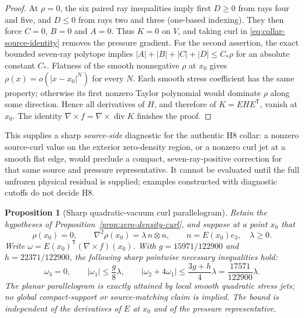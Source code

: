 \documentclass[11pt,a4paper]{article}
\theoremstyle{plain}
\newtheorem{proposition}[theorem]{Proposition}
\theoremstyle{definition}
\newcommand{\diver}{\operatorname{div}}
\begin{document}
\begin{proof}
At $\rho=0$, the six paired ray inequalities imply first
$D\ge0$ from rays four and five, and $D\le0$ from rays two and
three (one-based indexing). They then force $C=0$, $B=0$ and
$A=0$. Thus $K=0$ on $V$, and taking curl in
\eqref{eq:collar-source-identity} removes the pressure gradient.
For the second assertion, the exact bounded seven-ray polytope
implies $|A|+|B|+|C|+|D|\le C_*\rho$ for an absolute constant
$C_*$. Flatness of the smooth nonnegative $\rho$ at $x_0$ gives
$\rho(x)=o(|x-x_0|^N)$ for every $N$. Each smooth stress
coefficient has the same property; otherwise its first nonzero
Taylor polynomial would dominate $\rho$ along some direction.
Hence all derivatives of $H$, and therefore of $K=EHE^{\mathsf T}$,
vanish at $x_0$. The identity
$\nabla\times f=\nabla\times\diver K$ finishes the proof.
\end{proof}

This supplies a sharp \emph{source-side} diagnostic for the
authentic H8 collar: a nonzero source-curl value on the exterior
zero-density region, or a nonzero curl jet at a smooth flat edge,
would preclude a compact, seven-ray-positive correction for that
same source and pressure representative. It cannot be evaluated
until the full unfrozen physical residual is supplied; examples
constructed with diagnostic cutoffs do not decide H8.

\begin{proposition}[Sharp quadratic-vacuum curl parallelogram]
\label{prop:h8-vacuum-curl-parallelogram}
Retain the hypotheses of Proposition~\ref{prop:zero-density-curl},
and suppose at a point $x_0$ that
\[
 \rho(x_0)=0,\qquad
 \nabla^2\rho(x_0)=\lambda\,n\otimes n,\qquad
 n=E(x_0)e_3,\quad \lambda\ge0.
\]
Write $\omega=E(x_0)^{\mathsf T}(\nabla\times f)(x_0)$.
With $g=15971/122900$ and $h=22371/122900$, the following
\emph{sharp pointwise necessary} inequalities hold:
\begin{equation}\label{eq:h8-vacuum-curl-parallelogram}
 \omega_3=0,\qquad
 |\omega_1|\le\frac{g}{8}\lambda,
 \qquad
 |\omega_2+4\omega_1|
 \le\frac{3g+h}{4}\lambda
 =\frac{17571}{122900}\lambda.
\end{equation}
The planar parallelogram is exactly attained by local smooth
quadratic stress jets; no global compact-support or source-matching
claim is implied. The bound is independent of the derivatives of
$E$ at $x_0$ and of the pressure representative.
\end{proposition}
\end{document}
